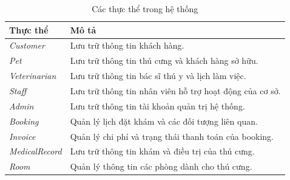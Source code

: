 \begin{table}[htbp]
    \centering
    \caption{Các thực thể trong hệ thống}
    \label{tab:entities_chapter1}
    \begin{tabular}{|p{3.2cm}|p{10cm}|}
        \hline
        \textbf{Thực thể} &
        \textbf{Mô tả} \\ \hline

        \textit{Customer} &
        Lưu trữ thông tin khách hàng. \\ \hline

        \textit{Pet} &
        Lưu trữ thông tin thú cưng và khách hàng sở hữu. \\ \hline

        \textit{Veterinarian} &
        Lưu trữ thông tin bác sĩ thú y và lịch làm việc. \\ \hline

        \textit{Staff} &
        Lưu trữ thông tin nhân viên hỗ trợ hoạt động của cơ sở. \\ \hline

        \textit{Admin} &
        Lưu trữ thông tin tài khoản quản trị hệ thống. \\ \hline

        \textit{Booking} &
        Quản lý lịch đặt khám và các đối tượng liên quan. \\ \hline

        \textit{Invoice} &
        Quản lý chi phí và trạng thái thanh toán của booking. \\ \hline

        \textit{MedicalRecord} &
        Lưu trữ thông tin khám và điều trị của thú cưng. \\ \hline

        \textit{Room} &
        Quản lý thông tin các phòng dành cho thú cưng. \\ \hline
    \end{tabular}
\end{table}


